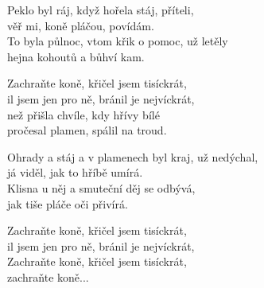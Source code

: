 
\ve{}
Peklo byl ráj, když hořela stáj, příteli,\\
věř mi, koně pláčou, povídám.  \\
To byla půlnoc, vtom křik o pomoc, už letěly\\
hejna kohoutů a bůhví kam.

\cho{}
Zachraňte koně, křičel jsem tisíckrát,\\
il jsem jen pro ně, bránil je nejvíckrát,\\
než přišla chvíle, kdy hřívy bílé\\
pročesal plamen, spálil na troud. 

\ve{}
Ohrady a stáj a v plamenech byl kraj, už nedýchal,\\
já viděl, jak to hříbě umírá.\\
Klisna u něj a smuteční děj se odbývá,\\
jak tiše pláče oči přivírá. 

\cho{}

\cho{}
Zachraňte koně, křičel jsem tisíckrát,\\
il jsem jen pro ně, bránil je nejvíckrát,\\
Zachraňte koně, křičel jsem tisíckrát,\\
zachraňte koně...

\esong